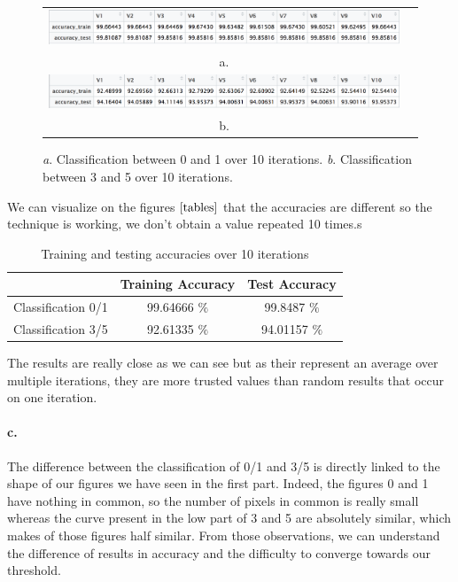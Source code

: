 \documentclass[a4paper,11pt]{article}
\begin{document}
\begin{figure}[!ht]
\centering
\begin{tabular}{cc}
	\includegraphics[width=.9\textwidth]{10_iterations_0_1}\\
	a.\\
	\includegraphics[width=.9\textwidth]{10_iterations_3_5}\\
	b.\\
\end{tabular}
\caption{\textit{a}. Classification between 0 and 1 over 10 iterations. \textit{b}. Classification between 3 and 5 over 10 iterations. }
\label{tables}
\end{figure}

We can visualize on the figures $\ref{tables}$ that the accuracies are different so the technique is working, we don't obtain a value repeated 10 times.s

\begin{table}[H]
\centering
\caption{Training and testing accuracies over 10 iterations}
\label{10 iterations}
\begin{tabular}{c|c|c|}
\cline{2-3}
 & Training Accuracy & Test Accuracy \\ \hline
\multicolumn{1}{|c|}{Classification 0/1} & 99.64666 $\%$ & 99.8487 $\%$ \\ \hline
\multicolumn{1}{|c|}{Classification 3/5} & 92.61335 $\%$ & 94.01157 $\%$ \\ \hline
\end{tabular}
\end{table}

The results are really close as we can see but as their represent an average over multiple iterations, they are more trusted values than random results that occur on one iteration.

\paragraph*{c.}

The difference between the classification of 0/1 and 3/5 is directly linked to the shape of our figures we have seen in the first part. Indeed, the figures 0 and 1 have nothing in common, so the number of pixels in common is really small whereas the curve present in the low part of 3 and 5 are absolutely similar, which makes of those figures half similar. From those observations, we can understand the difference of results in accuracy and the difficulty to converge towards our threshold.
\end{document}
